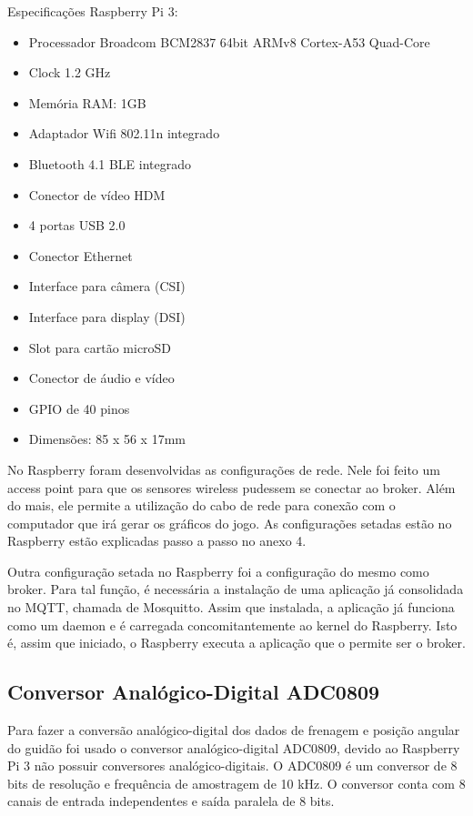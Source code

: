 Especificações Raspberry Pi 3:
\begin{itemize}
\item Processador Broadcom BCM2837 64bit ARMv8 Cortex-A53 Quad-Core
\item Clock 1.2 GHz
\item Memória RAM: 1GB
\item Adaptador Wifi 802.11n integrado
\item Bluetooth 4.1 BLE integrado
\item Conector de vídeo HDM
\item 4 portas USB 2.0
\item Conector Ethernet
\item Interface para câmera (CSI)
\item Interface para display (DSI)
\item Slot para cartão microSD
\item Conector de áudio e vídeo
\item GPIO de 40 pinos
\item Dimensões: 85 x 56 x 17mm
\end{itemize}

No Raspberry foram desenvolvidas as configurações de rede. Nele foi feito um access point para que os sensores wireless pudessem se conectar ao broker. Além do mais, ele permite a utilização do cabo de rede para conexão com o computador que irá gerar os gráficos do jogo. As configurações setadas estão no Raspberry estão explicadas passo a passo no anexo 4. 

Outra configuração setada no Raspberry foi a configuração do mesmo como broker. Para tal função, é necessária a instalação de uma aplicação já consolidada no MQTT, chamada de Mosquitto. Assim que instalada, a aplicação já funciona como um daemon e é carregada concomitantemente ao kernel do Raspberry. Isto é, assim que iniciado, o Raspberry executa a aplicação que o permite ser o broker.


\subsection{Conversor Analógico-Digital ADC0809}

	Para fazer a conversão analógico-digital dos dados de frenagem e posição angular do guidão foi usado o conversor analógico-digital ADC0809, devido ao Raspberry Pi 3 não possuir conversores analógico-digitais. O ADC0809 é um conversor de 8 bits de resolução e frequência de amostragem de 10 kHz. O conversor conta com 8 canais de entrada independentes e saída paralela de 8 bits. 

